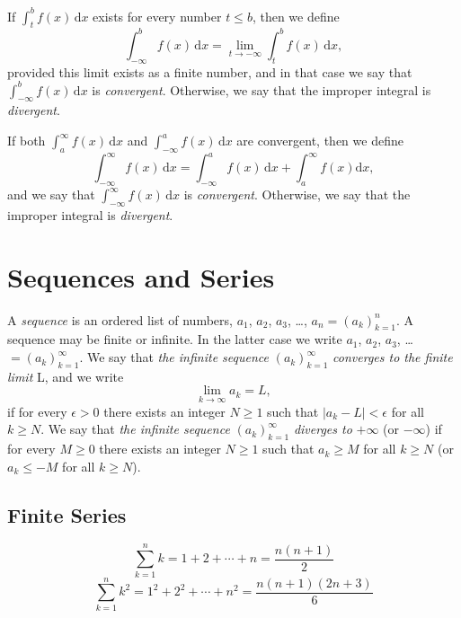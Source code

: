 \documentclass[captions=tableheading]{scrbook}
\begin{document}
If \(\int_{t}^{b}f(x)\,\mathrm{d} x\) exists for every number \(t\leq b\), then we define
\begin{equation}
\int_{-\infty}^{b}f(x)\,\mathrm{d} x=\lim_{t\to-\infty}\int_{t}^{b}f(x)\,\mathrm{d} x,
\end{equation}
provided this limit exists as a finite number, and in that case we say that \(\int_{-\infty}^{b}f(x)\,\mathrm{d} x\) is \emph{convergent}. Otherwise, we say that the improper integral is \emph{divergent}.

If both \(\int_{a}^{\infty}f(x)\,\mathrm{d} x\) and \(\int_{-\infty}^{a}f(x)\,\mathrm{d} x\) are convergent, then we define
\begin{equation}
\int_{-\infty}^{\infty}f(x)\,\mathrm{d} x=\int_{-\infty}^{a}f(x)\,\mathrm{d} x+\int_{a}^{\infty}f(x)\mathrm{d} x,
\end{equation}
and we say that \(\int_{-\infty}^{\infty}f(x)\,\mathrm{d} x\) is \emph{convergent}. Otherwise, we say that the improper integral is \emph{divergent}.
\section{Sequences and Series \label{sec:Sequences-and-Series}}
\label{sec-21-3}


A \emph{sequence} is an ordered list of numbers, \(a_{1}\), \(a_{2}\), \(a_{3}\), \ldots{}, \(a_{n} =\left(a_{k}\right)_{k=1}^{n}\). A sequence may be finite or infinite. In the latter case we write \(a_{1}\), \(a_{2}\), \(a_{3}\), \ldots{} \( =\left(a_{k}\right)_{k=1}^{\infty}\). We say that \emph{the infinite sequence} \(\left(a_{k}\right)_{k=1}^{\infty}\) \emph{converges to the finite limit} L, and we write
\begin{equation}
\lim_{k\to\infty}a_{k} = L,
\end{equation}
if for every \(\epsilon > 0\) there exists an integer \(N \geq 1\) such that \(|a_{k} - L| < \epsilon\) for all \(k \geq N\). We say that \emph{the infinite sequence} \(\left(a_{k}\right)_{k=1}^{\infty}\) \emph{diverges to} \(+\infty\) (or \( -\infty\)) if for every \(M\geq0\) there exists an integer \(N\geq1\) such that \(a_{k} \geq M\) for all \(k \geq N\) (or \(a_{k} \leq - M\) for all \(k \geq N\)).
\subsection{Finite Series}
\label{sec-21-3-1}


\begin{equation}
\sum_{k=1}^{n}k=1+2+\cdots+n=\frac{n(n+1)}{2}\label{eq:gauss-series}
\end{equation}
\begin{equation}
\sum_{k=1}^{n}k^{2}=1^{2}+2^{2}+\cdots+n^{2}=\frac{n(n+1)(2n+3)}{6}\label{eq:gauss-series-sq}
\end{equation}
\end{document}
